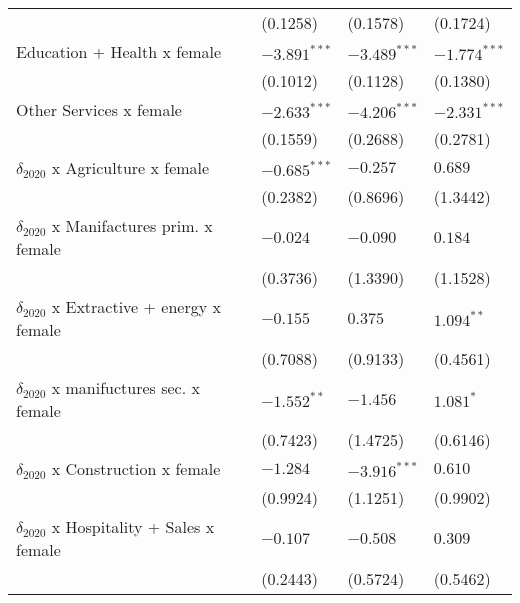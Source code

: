 \begin{tabular}{llll}
                                                   &           (0.1258) &           (0.1578) &           (0.1724) \\
Education + Health x female                        &     $-3.891^{***}$ &     $-3.489^{***}$ &     $-1.774^{***}$ \\
                                                   &           (0.1012) &           (0.1128) &           (0.1380) \\
Other Services x female                            &     $-2.633^{***}$ &     $-4.206^{***}$ &     $-2.331^{***}$ \\
                                                   &           (0.1559) &           (0.2688) &           (0.2781) \\
$\delta_{2020}$ x Agriculture x female             &     $-0.685^{***}$ &           $-0.257$ &            $0.689$ \\
                                                   &           (0.2382) &           (0.8696) &           (1.3442) \\
$\delta_{2020}$ x Manifactures prim. x female      &           $-0.024$ &           $-0.090$ &            $0.184$ \\
                                                   &           (0.3736) &           (1.3390) &           (1.1528) \\
$\delta_{2020}$ x Extractive + energy x female     &           $-0.155$ &            $0.375$ &       $1.094^{**}$ \\
                                                   &           (0.7088) &           (0.9133) &           (0.4561) \\
$\delta_{2020}$ x manifuctures sec. x female       &      $-1.552^{**}$ &           $-1.456$ &          $1.081^*$ \\
                                                   &           (0.7423) &           (1.4725) &           (0.6146) \\
$\delta_{2020}$ x Construction x female            &           $-1.284$ &     $-3.916^{***}$ &            $0.610$ \\
                                                   &           (0.9924) &           (1.1251) &           (0.9902) \\
$\delta_{2020}$ x Hospitality + Sales x female     &           $-0.107$ &           $-0.508$ &            $0.309$ \\
                                                   &           (0.2443) &           (0.5724) &           (0.5462) \\

\end{tabular}
